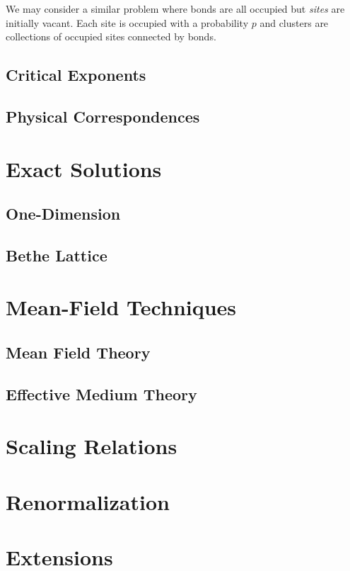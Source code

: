 We may consider a similar problem where bonds are all occupied but \emph{sites}
are initially vacant.  Each site is occupied with a probability $p$ and clusters
are collections of occupied sites connected by bonds.

\subsection{Critical Exponents}
\subsection{Physical Correspondences}
\section{Exact Solutions}
\subsection{One-Dimension}
\subsection{Bethe Lattice}
\section{Mean-Field Techniques}
\subsection{Mean Field Theory}
\subsection{Effective Medium Theory}
\section{Scaling Relations}
\section{Renormalization}
\section{Extensions}

